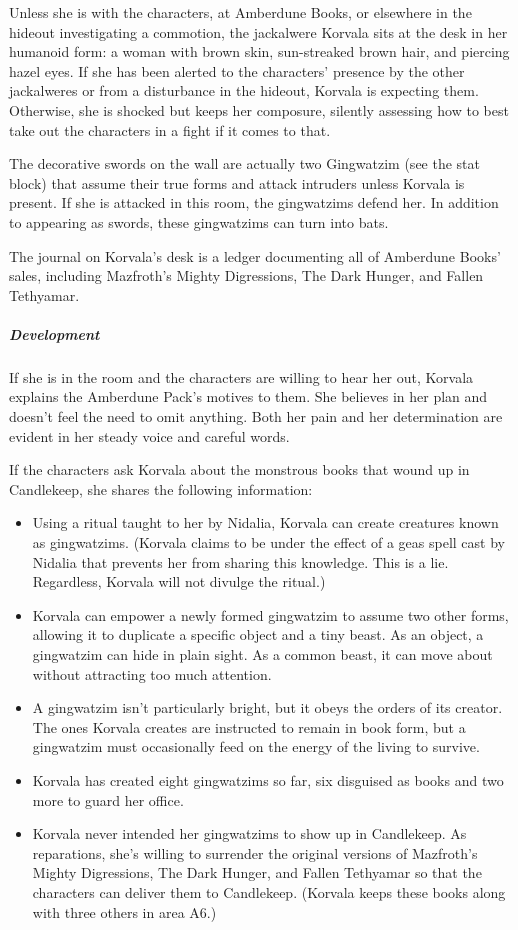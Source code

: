 \documentclass[10pt,a4paper,twoside,bg=print,twocolumn,openany,nodeprecatedcode]{dndbook}
\begin{document}
Unless she is with the characters, at Amberdune Books, or elsewhere in the hideout investigating a commotion, the jackalwere Korvala sits at the desk in her humanoid form: a woman with brown skin, sun-streaked brown hair, and piercing hazel eyes. If she has been alerted to the characters' presence by the other jackalweres or from a disturbance in the hideout, Korvala is expecting them. Otherwise, she is shocked but keeps her composure, silently assessing how to best take out the characters in a fight if it comes to that.

The decorative swords on the wall are actually two Gingwatzim (see the stat block) that assume their true forms and attack intruders unless Korvala is present. If she is attacked in this room, the gingwatzims defend her. In addition to appearing as swords, these gingwatzims can turn into bats.

The journal on Korvala's desk is a ledger documenting all of Amberdune Books' sales, including Mazfroth's Mighty Digressions, The Dark Hunger, and Fallen Tethyamar.

\subparagraph{Development}
If she is in the room and the characters are willing to hear her out, Korvala explains the Amberdune Pack's motives to them. She believes in her plan and doesn't feel the need to omit anything. Both her pain and her determination are evident in her steady voice and careful words.

If the characters ask Korvala about the monstrous books that wound up in Candlekeep, she shares the following information:


\begin{itemize}
\item Using a ritual taught to her by Nidalia, Korvala can create creatures known as gingwatzims. (Korvala claims to be under the effect of a geas spell cast by Nidalia that prevents her from sharing this knowledge. This is a lie. Regardless, Korvala will not divulge the ritual.)
\item Korvala can empower a newly formed gingwatzim to assume two other forms, allowing it to duplicate a specific object and a tiny beast. As an object, a gingwatzim can hide in plain sight. As a common beast, it can move about without attracting too much attention.
\item A gingwatzim isn't particularly bright, but it obeys the orders of its creator. The ones Korvala creates are instructed to remain in book form, but a gingwatzim must occasionally feed on the energy of the living to survive.
\item Korvala has created eight gingwatzims so far, six disguised as books and two more to guard her office.
\item Korvala never intended her gingwatzims to show up in Candlekeep. As reparations, she's willing to surrender the original versions of Mazfroth's Mighty Digressions, The Dark Hunger, and Fallen Tethyamar so that the characters can deliver them to Candlekeep. (Korvala keeps these books along with three others in area A6.) 
\end{itemize}
\end{document}
